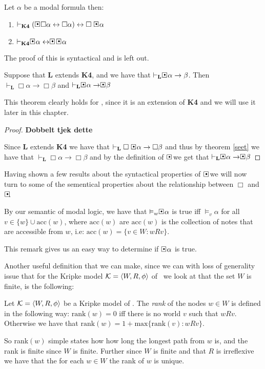 \documentclass[../main.tex]{subfiles}
\begin{document}
\begin{thm}
	\label{seet}
	Let $\alpha$ be a modal formula then:
	\begin{enumerate}
		\item $\vdash_{\textbf{K4}}(\sBox\Box\alpha\leftrightarrow\Box\alpha)\leftrightarrow
	\Box\sBox \alpha$
	\item $\vdash_{\textbf{K4}}\sBox\alpha\leftrightarrow\sBox\
		\sBox\alpha$
	\end{enumerate}
\end{thm}
The proof of this is syntactical and is left out.
\begin{thm}
	\label{GLsæt}
	Suppose that \textbf{L} extends \textbf{K4}, and we have that
	$\vdash_{\textbf{L}}\sBox\alpha\rightarrow\beta$. Then
	$\vdash_{\textbf{L}}\Box\alpha\rightarrow\Box\beta$ and
	$\vdash_{\textbf{L}}\sBox\alpha\rightarrow\sBox\beta$
\end{thm}
This theorem clearly holds for \GL, since it is an extension of \textbf{K4} and we will use it later in this chapter.
\begin{proof}
	\textbf{Dobbelt tjek dette}

	Since \textbf{L} extends \textbf{K4} we have that
	$\vdash_{\textbf{L}}\Box\sBox\alpha\rightarrow\Box\beta$ and thus by
	theorem \ref{seet} we have that
	$\vdash_{\textbf{L}}\Box\alpha\rightarrow\Box\beta$ and by the
	definition of $\sBox$ we get that
	$\vdash_{\textbf{L}}\sBox\alpha\rightarrow\sBox\beta$
\end{proof}
Having shown a few results about the syntactical  properties of $\sBox$ we will now
turn to some of the sementical properties about the relationship between $\Box$
and $\sBox$.
\begin{remark}
	\label{rem:acc}
By our semantic of modal logic,  we have that $\vDash_w\sBox\alpha$ is true iff $\vDash_v\alpha$
for all $v\in\{w\}\cup\text{acc}(w)$, where $\text{acc}(w)$ are $\text{acc}(w)$
is the collection of notes that are accessible  from $w$, i.e:
$\text{acc}(w)=\{v\in W:wRv\}$.
\end{remark}

This remark gives us an easy way to determine if $\sBox \alpha$ is true.


Another useful definition that we can make, since we can with loss of
generality issue that  for the  Kripke model 
$\mathcal{K}=\langle W,R,\phi\rangle$ of \GL\  we look at that the set $W$ is finite,
is the following:
\begin{defi}
	Let $\mathcal{K}=\langle W,R,\phi\rangle$ be a Kripke model of \GL. The
	\textit{rank} of the nodes $w\in W$ is defined in the following
	way: $\text{rank}(w)=0$ iff there is no world $v$ such that
	$wRv$. Otherwise we have that
	$\text{rank}(w)=1+\text{max}\{\text{rank}(v):wRv\}$.
\end{defi}
So rank$(w)$ simple states how how long the longest path from $w$ is, and the
rank is finite since $W$ is finite.
Further since $W$ is finite and that $R$ is irreflexive we have that the for each $w\in
W$ the rank of $w$ is unique.
\end{document}
